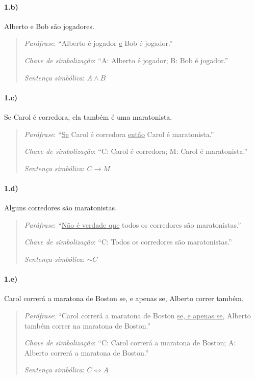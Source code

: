 \documentclass[pdftex,a4paper,12pt,brazil]{article} %
\begin{document}
\paragraph{1.b)} Alberto e Bob são jogadores.

\begin{quote}
  \emph{Paráfrase}: ``Alberto é jogador \underline{e} Bob é jogador.''

  \emph{Chave de simbolização}: ``A: Alberto é jogador; B: Bob é jogador.''

  \emph{Sentença simbólica}: $A \wedge B$
\end{quote}

\paragraph{1.c)} Se Carol é corredora, ela também é uma maratonista.

\begin{quote}
  \emph{Paráfrase}: ``\underline{Se} Carol é corredora \underline{então} Carol é maratonista.''

  \emph{Chave de simbolização}: ``C: Carol é corredora; M: Carol é maratonista.''

  \emph{Sentença simbólica}: $C \rightarrow M$
\end{quote}

\paragraph{1.d)} Alguns corredores são maratonistas.

\begin{quote}
  \emph{Paráfrase}: ``\underline{Não é verdade que} todos os corredores são maratonistas.''

  \emph{Chave de simbolização}: ``C: Todos os corredores são maratonistas.''

  \emph{Sentença simbólica}: $\sim C$
\end{quote}

\paragraph{1.e)} Carol correrá a maratona de Boston se, e apenas se, Alberto correr também.

\begin{quote}
  \emph{Paráfrase}: ``Carol correrá a maratona de Boston \underline{se, e apenas se,} Alberto também correr
  na maratona de Boston.''

  \emph{Chave de simbolização}: ``C: Carol correrá a maratona de Boston; A: Alberto correrá a maratona de Boston.''

  \emph{Sentença simbólica}: $C \Leftrightarrow A$
\end{quote}
\end{document}
